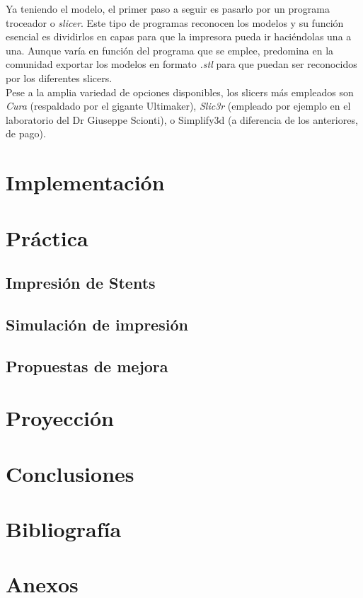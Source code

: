 \documentclass[a4paper,12pt]{article}
\begin{document}
Ya teniendo el modelo, el primer paso a seguir es pasarlo por un programa troceador o \emph{slicer}. Este tipo de programas reconocen los modelos y su función esencial es dividirlos en capas para que la impresora pueda ir haciéndolas una a una. Aunque varía en función del programa que se emplee, predomina en la comunidad exportar los modelos en formato \emph{.stl} para que puedan ser reconocidos por los diferentes slicers.\\

Pese a la amplia variedad de opciones disponibles, los slicers más empleados son \emph{Cura} (respaldado por el gigante Ultimaker), \emph{Slic3r} (empleado por ejemplo en el laboratorio del Dr Giuseppe Scionti), o Simplify3d (a diferencia de los anteriores, de pago).\\





\pagebreak
\section{Implementación}


\pagebreak
\section{Práctica}
\subsection{Impresión de Stents}
\subsection{Simulación de impresión}
\subsection{Propuestas de mejora}



\pagebreak
\section{Proyección}

\pagebreak
\section{Conclusiones}


\pagebreak
\section{Bibliografía}


\pagebreak
\section{Anexos}
\end{document}
